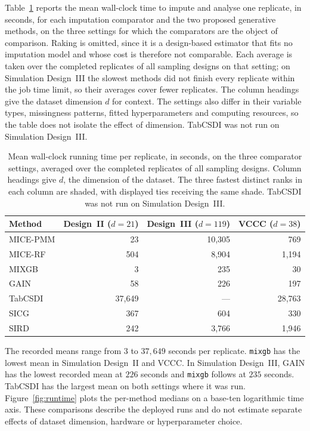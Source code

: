 Table~\ref{tab:runtime} reports the mean wall-clock time to impute and analyse one replicate, in seconds, for each imputation comparator and the two proposed generative methods, on the three settings for which the comparators are the object of comparison. Raking is omitted, since it is a design-based estimator that fits no imputation model and whose cost is therefore not comparable. Each average is taken over the completed replicates of all sampling designs on that setting; on Simulation Design~III the slowest methods did not finish every replicate within the job time limit, so their averages cover fewer replicates. The column headings give the dataset dimension $d$ for context. The settings also differ in their variable types, missingness patterns, fitted hyperparameters and computing resources, so the table does not isolate the effect of dimension. TabCSDI was not run on Simulation Design~III.

\begin{table}[ht]
\centering
\caption{Mean wall-clock running time per replicate, in seconds, on the three comparator settings, averaged over the completed replicates of all sampling designs. Column headings give $d$, the dimension of the dataset. The three fastest distinct ranks in each column are shaded, with displayed ties receiving the same shade. TabCSDI was not run on Simulation Design~III.}
\label{tab:runtime}
\begin{tabular}{lrrr}
\toprule
Method & Design~II ($d=21$) & Design~III ($d=119$) & VCCC ($d=38$) \\
\midrule
MICE-PMM & \cellcolor{ranktwo}23 & 10{,}305 & 769 \\
MICE-RF & 504 & 8{,}904 & 1{,}194 \\
MIXGB & \cellcolor{rankone}3 & \cellcolor{ranktwo}235 & \cellcolor{rankone}30 \\
GAIN & \cellcolor{rankthree}58 & \cellcolor{rankone}226 & \cellcolor{ranktwo}197 \\
TabCSDI & 37{,}649 & --- & 28{,}763 \\
SICG & 367 & \cellcolor{rankthree}604 & \cellcolor{rankthree}330 \\
SIRD & 242 & 3{,}766 & 1{,}946 \\
\bottomrule
\end{tabular}
\end{table}

The recorded means range from $3$ to $37{,}649$ seconds per replicate. \texttt{mixgb} has the lowest mean in Simulation Design~II and VCCC. In Simulation Design~III, GAIN has the lowest recorded mean at $226$ seconds and \texttt{mixgb} follows at $235$ seconds. TabCSDI has the largest mean on both settings where it was run. Figure~\ref{fig:runtime} plots the per-method medians on a base-ten logarithmic time axis. These comparisons describe the deployed runs and do not estimate separate effects of dataset dimension, hardware or hyperparameter choice.

